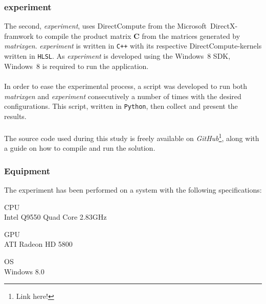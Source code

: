 \documentclass[fleqn,10pt]{SelfArx} %
\begin{document}
\subsubsection*{experiment}
The second, \textit{experiment}, uses DirectCompute from the Microsoft~DirectX-framwork to compile the product matrix \textbf{C} from the matrices generated by \textit{matrixgen}. \textit{experiment} is written in \texttt{C++} with its respective DirectCompute-kernels written in \texttt{HLSL}. As \textit{experiment} is developed using the Windows~8 SDK, Windows~8 is required to run the application. \\
\\
In order to ease the experimental process, a script was developed to run both \textit{matrixgen} and \textit{experiment} consecutively a number of times with the desired configurations. This script, written in \texttt{Python}, then collect and present the results. \\
\\
The source code used during this study is freely available on \textit{GitHub}\footnote{Link here!}, along with a guide on how to compile and run the solution.

\subsubsection*{Equipment}
The experiment has been performed on a system with the following specifications:
\begin{description*}
	\item[CPU] \hfill \\
		Intel Q9550 Quad Core 2.83GHz
	\item[GPU] \hfill \\
		ATI Radeon HD 5800
	\item[OS] \hfill \\
		Windows 8.0
\end{description*}

\end{document}
